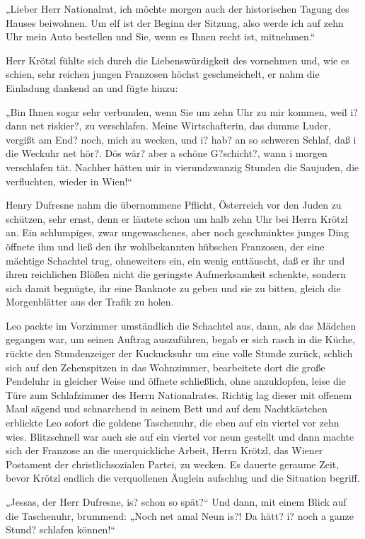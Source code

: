 „Lieber Herr Nationalrat, ich möchte morgen auch der historischen
Tagung des Hauses beiwohnen. Um elf ist der Beginn der Sitzung,
also werde ich auf zehn Uhr mein Auto bestellen und Sie, wenn es
Ihnen recht ist, mitnehmen.“

Herr Krötzl fühlte sich durch die Liebenswürdigkeit des vornehmen
und, wie es schien, sehr reichen jungen Franzosen 
höchst geschmeichelt, er nahm die Einladung dankend an und fügte
hinzu:

„Bin Ihnen sogar sehr verbunden, wenn Sie um zehn Uhr zu mir
kommen, weil i? dann net riskier?, zu verschlafen. Meine
Wirtschafterin, das dumme Luder, vergißt am End? noch, mich zu
wecken, und i? hab? an so schweren Schlaf, daß i die Weckuhr net
hör?. Dös wär? aber a schöne G?schicht?, wann i morgen verschlafen
tät. Nachher hätten mir in vierundzwanzig Stunden die Saujuden, die
verfluchten, wieder in Wien!“

Henry Dufresne nahm die übernommene Pflicht, Österreich vor den
Juden zu schützen, sehr ernst, denn er läutete schon um halb zehn
Uhr bei Herrn Krötzl an. Ein schlumpiges, zwar ungewaschenes, aber
noch geschminktes junges Ding öffnete ihm und ließ den ihr
wohlbekannten hübschen Franzosen, der eine mächtige Schachtel trug,
ohneweiters ein, ein wenig enttäuscht, daß er ihr und ihren
reichlichen Blößen nicht die geringste Aufmerksamkeit schenkte,
sondern sich damit begnügte, ihr eine Banknote zu geben und sie zu
bitten, gleich die Morgenblätter aus der Trafik zu holen.

Leo packte im Vorzimmer umständlich die Schachtel aus, dann, als
das Mädchen gegangen war, um seinen Auftrag auszuführen, begab er
sich rasch in die Küche, rückte den Stundenzeiger der Kuckucksuhr
um eine volle Stunde zurück, schlich sich auf den Zehenspitzen in
das Wohnzimmer, bearbeitete dort die große Pendeluhr in gleicher
Weise und öffnete schließlich, ohne anzuklopfen, leise die Türe zum
Schlafzimmer des Herrn Nationalrates. Richtig lag dieser mit
offenem Maul sägend und schnarchend in seinem Bett 
und auf dem Nachtkästchen erblickte Leo sofort die goldene
Taschenuhr, die eben auf ein viertel vor zehn wies. Blitzschnell
war auch sie auf ein viertel vor neun gestellt und dann machte sich
der Franzose an die unerquickliche Arbeit, Herrn Krötzl, das Wiener
Postament der christlichsozialen Partei, zu wecken. Es dauerte
geraume Zeit, bevor Krötzl endlich die verquollenen Äuglein
aufschlug und die Situation begriff.

„Jessas, der Herr Dufresne, is? schon so spät?“ Und dann, mit einem
Blick auf die Taschenuhr, brummend: „Noch net amal Neun is?! Da
hätt? i? noch a ganze Stund? schlafen können!“

